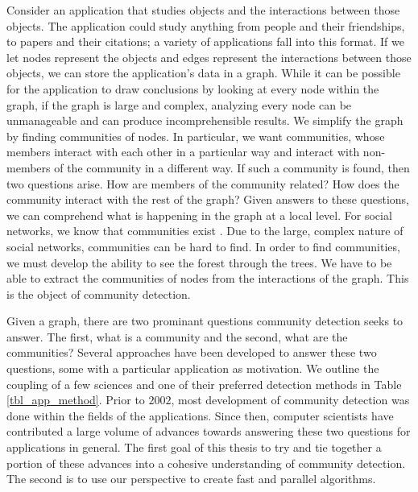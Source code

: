 \documentclass[phd,tocprelim]{cornell}
\begin{document}
Consider an application that studies objects and the interactions between those objects.  The application could study anything from people and their friendships, to papers and their citations; a variety of applications fall into this format.  If we let nodes represent the objects and edges represent the interactions between those objects, we can store the application's data in a graph.  While it can be possible for the application to draw conclusions by looking at every node within the graph, if the graph is large and complex, analyzing every node can be unmanageable and can produce incomprehensible results.   We simplify the graph by finding communities of nodes.  In particular, we want communities, whose members interact with each other in a particular way and interact with non-members of the community in a different way. If such a community is found, then two questions arise.  How are members of the community related?  How does the community interact with the rest of the graph?  Given answers to these questions, we can comprehend what is happening in the graph at a local level.  For social networks, we know that communities exist \cite{JTODO}.  Due to the large, complex nature of social networks, communities can be hard to find.  In order to find communities, we must develop the ability to see the forest through the trees.  We have to be able to extract the communities of nodes from the interactions of the graph.  This is the object of community detection.


Given a graph, there are two prominant questions community detection seeks to answer.  The first, what is a community and the second, what are the communities?  Several approaches have been developed to answer these two questions, some with a particular application as motivation.  We outline the coupling of a few sciences and one of their preferred detection methods in Table \ref{tbl_app_method}. Prior to $2002$, most development of community detection was done within the fields of the applications.  Since then, computer scientists have contributed a large volume of advances towards answering these two questions for applications in general.  The first goal of this thesis to try and tie together a portion of these advances into a cohesive understanding of community detection.  The second is to use our perspective to create fast and parallel algorithms.
\end{document}
